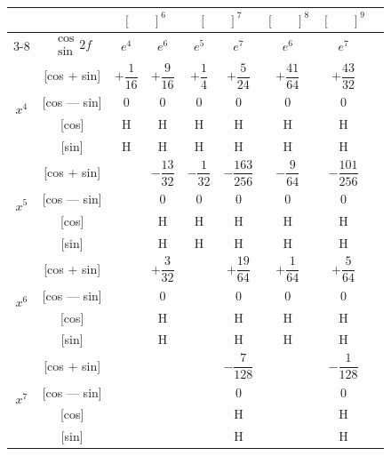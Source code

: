 \documentclass[11pt,a4paper]{book}
\begin{document}
{{\vspace{1em}


\begin{center}
\small
\begin{tabular}{|c|c|c|c|c|c|c|c|c|}
\hline
& & \multicolumn{2}{c|}{$[\phantom{()}]^6$} & \multicolumn{2}{c|}{$[\phantom{()}]^7$} & \multicolumn{1}{c|}{$[\phantom{()}]^8$} & \multicolumn{1}{c|}{$[\phantom{()}]^9$} \\
\cline{3-8}
& $\begin{smallmatrix} \cos \\ \sin \end{smallmatrix} 2f$ & $e^4$ & $e^6$ & $e^5$ & $e^7$ & $e^6$ & $e^7$ \\
\hline
\multirow{4}{*}{$x^4$} & [cos + sin] & $+\dfrac{1}{16}$ & $+\dfrac{9}{16}$ & $+\dfrac{1}{4}$ & $+\dfrac{5}{24}$ & $+\dfrac{41}{64}$ & $+\dfrac{43}{32}$ \\
& [cos --- sin] & $0$ & $0$ & $0$ & $0$ & $0$ & $0$ \\
& [cos] & H & H & H & H & H & H \\
& [sin] & H & H & H & H & H & H \\
\hline
\multirow{4}{*}{$x^5$} & [cos + sin] & & $-\dfrac{13}{32}$ & $-\dfrac{1}{32}$ & $-\dfrac{163}{256}$ & $-\dfrac{9}{64}$ & $-\dfrac{101}{256}$ \\
& [cos --- sin] & & $0$ & $0$ & $0$ & $0$ & $0$ \\
& [cos] & & H & H & H & H & H \\
& [sin] & & H & H & H & H & H \\
\hline
\multirow{4}{*}{$x^6$} & [cos + sin] & & $+\dfrac{3}{32}$ & & $+\dfrac{19}{64}$ & $+\dfrac{1}{64}$ & $+\dfrac{5}{64}$ \\
& [cos --- sin] & & $0$ & & $0$ & $0$ & $0$ \\
& [cos] & & H & & H & H & H \\
& [sin] & & H & & H & H & H \\
\hline
\multirow{4}{*}{$x^7$} & [cos + sin] & & & & $-\dfrac{7}{128}$ & & $-\dfrac{1}{128}$ \\
& [cos --- sin] & & & & $0$ & & $0$ \\
& [cos] & & & & H & & H \\
& [sin] & & & & H & & H \\
\hline
\end{tabular}
\end{center}

}}
\end{document}
